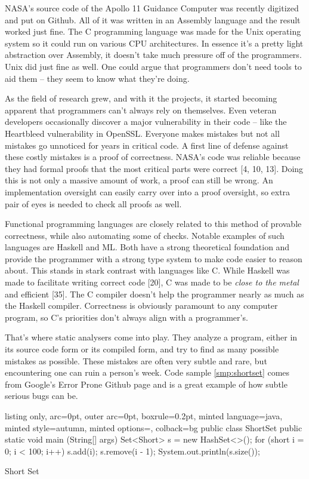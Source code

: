 \documentclass[]{article}
\begin{document}
NASA's source code of the Apollo 11 Guidance Computer was recently
digitized and put on Github. All of it was written in an Assembly
language and the result worked just fine. The C programming language was
made for the Unix operating system so it could run on various CPU
architectures. In essence it's a pretty light abstraction over Assembly,
it doesn't take much pressure off of the programmers. Unix did just fine
as well. One could argue that programmers don't need tools to aid them
-- they seem to know what they're doing.

As the field of research grew, and with it the projects, it started
becoming apparent that programmers can't always rely on themselves. Even
veteran developers occasionally discover a major vulnerability in their
code -- like the Heartbleed vulnerability in OpenSSL. Everyone makes
mistakes but not all mistakes go unnoticed for years in critical code. A
first line of defense against these costly mistakes is a proof of
correctness. NASA's code was reliable because they had formal proofs
that the most critical parts were correct {[}4, 10, 13{]}. Doing this is
not only a massive amount of work, a proof can still be wrong. An
implementation oversight can easily carry over into a proof oversight,
so extra pair of eyes is needed to check all proofs as well.

Functional programming languages are closely related to this method of
provable correctness, while also automating some of checks. Notable
examples of such languages are Haskell and ML. Both have a strong
theoretical foundation and provide the programmer with a strong type
system to make code easier to reason about. This stands in stark
contrast with languages like C. While Haskell was made to facilitate
writing correct code {[}20{]}, C was made to be \emph{close to the
metal} and efficient {[}35{]}. The C compiler doesn't help the
programmer nearly as much as the Haskell compiler. Correctness is
obviously paramount to any computer program, so C's priorities don't
always align with a programmer's.

That's where static analysers come into play. They analyze a program,
either in its source code form or its compiled form, and try to find as
many possible mistakes as possible. These mistakes are often very subtle
and rare, but encountering one can ruin a person's week. Code sample
\ref{smp:shortset} comes from Google's Error Prone Github page and is a
great example of how subtle serious bugs can be.

\begin{code}
  \begin{tcblisting}{listing only, 
  arc=0pt,
  outer arc=0pt, 
  boxrule=0.2pt,
  minted language=java,
  minted style=autumn,
  minted options={},
  colback=bg }
public class ShortSet {
  public static void main (String[] args) {
    Set<Short> s = new HashSet<>();
    for (short i = 0; i < 100; i++) {
      s.add(i);
      s.remove(i - 1);
    }
    System.out.println(s.size());
  }
}
\end{tcblisting}
\caption{Short Set}\label{smp:shortset}
\end{code}
\end{document}
